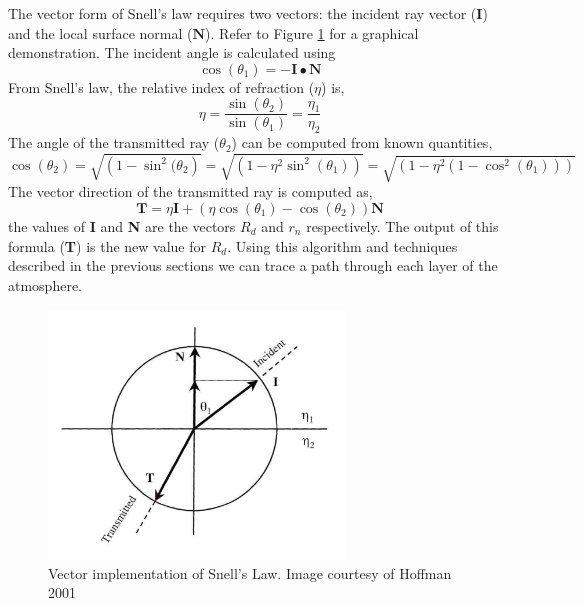 The vector form of Snell's law requires two vectors: the incident ray vector ($\textbf{I}$) and the local surface normal ($\textbf{N}$). Refer to Figure \ref{fig:incident} for a graphical demonstration. The incident angle is calculated using
\begin{equation}
\cos (\theta_1) = -\textbf{I} \bullet \textbf{N}
\end{equation}
From Snell's law, the relative index of refraction ($\eta$) is,
\begin{equation}
\eta = \frac{\sin (\theta_2)}{\sin(\theta_1)} = \frac{\eta_1}{\eta_2}
\end{equation}
The angle of the transmitted ray ($\theta_2$) can be computed from known quantities,
\begin{equation}
\cos(\theta_2) = \sqrt{\left(1-\sin^2(\theta_2\right)}= \sqrt{\left(1-\eta^2\sin^2(\theta_1)\right)} =  \sqrt{\left(1-\eta^2(1-\cos^2(\theta_1))\right)}
\end{equation}
The vector direction of the transmitted ray is computed as,
\begin{equation}
\textbf{T} = \eta\textbf{I} + (\eta\cos(\theta_1) -\cos (\theta_2))\textbf{N}
\end{equation}
the values of \textbf{I} and \textbf{N} are the vectors $R_d$ and $r_n$ respectively. The output of this formula (\textbf{T}) is the new value for $R_d$. Using this algorithm and techniques described in the previous sections we can trace a path through each layer of the atmosphere.

\begin{figure}[!p]
    \centering
	\includegraphics[width=0.7\textwidth]{./rtm/incident.png}
	\caption{Vector implementation of Snell's Law. Image courtesy of Hoffman 2001 \cite{Hoffman-thesis}}
		\label{fig:incident}
\end{figure}
\clearpage
